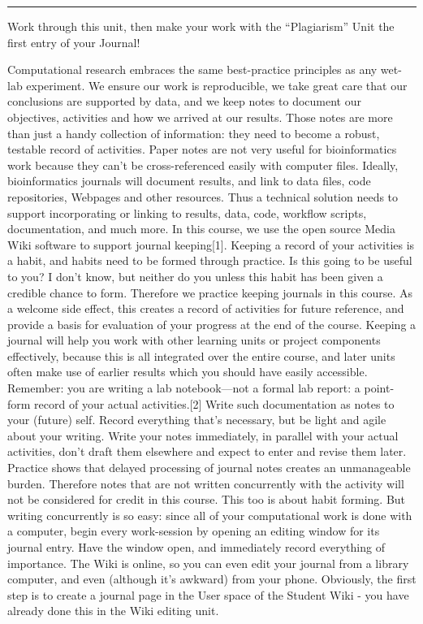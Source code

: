 \documentclass[]{book}
\begin{document}
\begin{center}\rule{0.5\linewidth}{\linethickness}\end{center}

Work through this unit, then make your work with the ``Plagiarism'' Unit
the first entry of your Journal!

Computational research embraces the same best-practice principles as any
wet-lab experiment. We ensure our work is reproducible, we take great
care that our conclusions are supported by data, and we keep notes to
document our objectives, activities and how we arrived at our results.
Those notes are more than just a handy collection of information: they
need to become a robust, testable record of activities. Paper notes are
not very useful for bioinformatics work because they can't be
cross-referenced easily with computer files. Ideally, bioinformatics
journals will document results, and link to data files, code
repositories, Webpages and other resources. Thus a technical solution
needs to support incorporating or linking to results, data, code,
workflow scripts, documentation, and much more. In this course, we use
the open source Media Wiki software to support journal keeping{[}1{]}.
Keeping a record of your activities is a habit, and habits need to be
formed through practice. Is this going to be useful to you? I don't
know, but neither do you unless this habit has been given a credible
chance to form. Therefore we practice keeping journals in this course.
As a welcome side effect, this creates a record of activities for future
reference, and provide a basis for evaluation of your progress at the
end of the course. Keeping a journal will help you work with other
learning units or project components effectively, because this is all
integrated over the entire course, and later units often make use of
earlier results which you should have easily accessible. Remember: you
are writing a lab notebook---not a formal lab report: a point-form
record of your actual activities.{[}2{]} Write such documentation as
notes to your (future) self. Record everything that's necessary, but be
light and agile about your writing. Write your notes immediately, in
parallel with your actual activities, don't draft them elsewhere and
expect to enter and revise them later. Practice shows that delayed
processing of journal notes creates an unmanageable burden. Therefore
notes that are not written concurrently with the activity will not be
considered for credit in this course. This too is about habit forming.
But writing concurrently is so easy: since all of your computational
work is done with a computer, begin every work-session by opening an
editing window for its journal entry. Have the window open, and
immediately record everything of importance. The Wiki is online, so you
can even edit your journal from a library computer, and even (although
it's awkward) from your phone. Obviously, the first step is to create a
journal page in the User space of the Student Wiki - you have already
done this in the Wiki editing unit.
\end{document}
